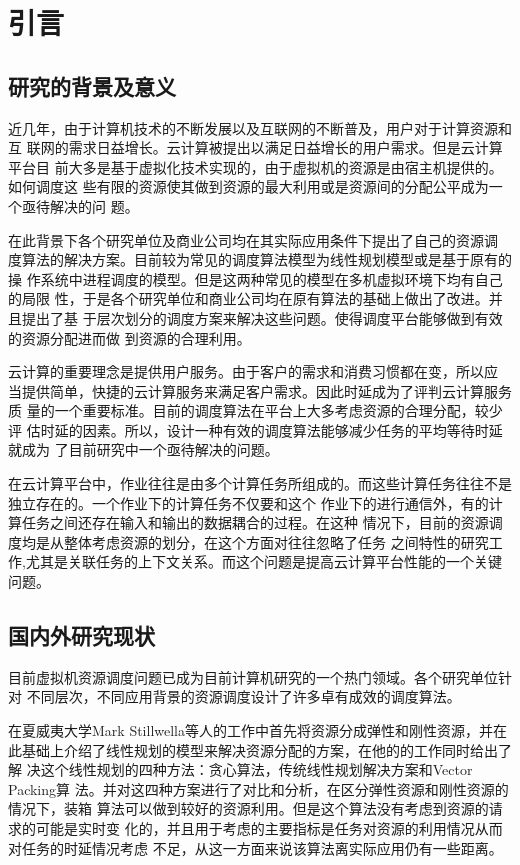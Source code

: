 

\chapter{引言}
\label{chap:introduction}


\section{研究的背景及意义}

近几年，由于计算机技术的不断发展以及互联网的不断普及，用户对于计算资源和互
联网的需求日益增长。云计算被提出以满足日益增长的用户需求。但是云计算平台目
前大多是基于虚拟化技术实现的，由于虚拟机的资源是由宿主机提供的。如何调度这
些有限的资源使其做到资源的最大利用或是资源间的分配公平成为一个亟待解决的问
题。

在此背景下各个研究单位及商业公司均在其实际应用条件下提出了自己的资源调
度算法的解决方案。目前较为常见的调度算法模型为线性规划模型或是基于原有的操
作系统中进程调度的模型。但是这两种常见的模型在多机虚拟环境下均有自己的局限
性，于是各个研究单位和商业公司均在原有算法的基础上做出了改进。并且提出了基
于层次划分的调度方案来解决这些问题。使得调度平台能够做到有效的资源分配进而做
到资源的合理利用。

云计算的重要理念是提供用户服务。由于客户的需求和消费习惯都在变，所以应
当提供简单，快捷的云计算服务来满足客户需求。因此时延成为了评判云计算服务质
量的一个重要标准。目前的调度算法在平台上大多考虑资源的合理分配，较少评
估时延的因素。所以，设计一种有效的调度算法能够减少任务的平均等待时延就成为
了目前研究中一个亟待解决的问题。

在云计算平台中，作业往往是由多个计算任务所组成的。而这些计算任务往往不是独立存在的。一个作业下的计算任务不仅要和这个
作业下的进行通信外，有的计算任务之间还存在输入和输出的数据耦合的过程。在这种
情况下，目前的资源调度均是从整体考虑资源的划分，在这个方面对往往忽略了任务
之间特性的研究工作,尤其是关联任务的上下文关系。而这个问题是提高云计算平台性能的一个关键问题。

\section{国内外研究现状}

目前虚拟机资源调度问题已成为目前计算机研究的一个热门领域。各个研究单位针对
不同层次，不同应用背景的资源调度设计了许多卓有成效的调度算法。

在夏威夷大学Mark Stillwella等人\cite{ref3}的工作中首先将资源分成弹性和刚性资源，并在
此基础上介绍了线性规划的模型来解决资源分配的方案，在他的的工作同时给出了解
决这个线性规划的四种方法：贪心算法，传统线性规划解决方案和Vector Packing算
法。并对这四种方案进行了对比和分析，在区分弹性资源和刚性资源的情况下，装箱
算法可以做到较好的资源利用。但是这个算法没有考虑到资源的请求的可能是实时变
化的，并且用于考虑的主要指标是任务对资源的利用情况从而对任务的时延情况考虑
不足，从这一方面来说该算法离实际应用仍有一些距离。

